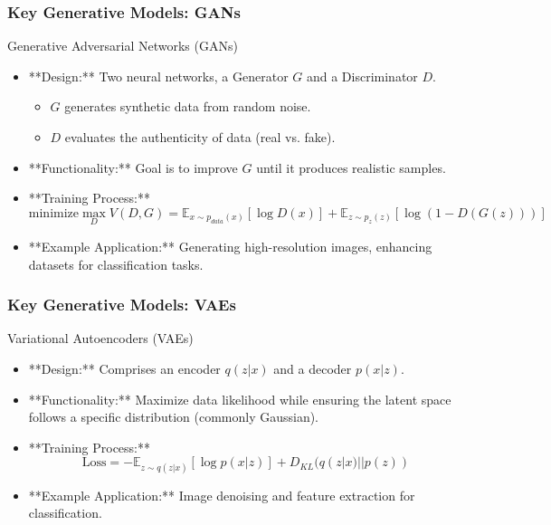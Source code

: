 \documentclass[aspectratio=169]{beamer}
\begin{document}
\begin{frame}[fragile]
    \frametitle{Key Generative Models: GANs}
    \begin{block}{Generative Adversarial Networks (GANs)}
        \begin{itemize}
            \item **Design:** Two neural networks, a Generator \( G \) and a Discriminator \( D \).
                \begin{itemize}
                    \item \( G \) generates synthetic data from random noise.
                    \item \( D \) evaluates the authenticity of data (real vs. fake).
                \end{itemize}
            \item **Functionality:** Goal is to improve \( G \) until it produces realistic samples.
            \item **Training Process:**
                \begin{equation}
                    \text{minimize} \max_{D} V(D, G) = \mathbb{E}_{x \sim p_{data}(x)}[\log D(x)] + \mathbb{E}_{z \sim p_{z}(z)}[\log(1 - D(G(z)))]
                \end{equation}
            \item **Example Application:** Generating high-resolution images, enhancing datasets for classification tasks.
        \end{itemize}
    \end{block}
\end{frame}

\begin{frame}[fragile]
    \frametitle{Key Generative Models: VAEs}
    \begin{block}{Variational Autoencoders (VAEs)}
        \begin{itemize}
            \item **Design:** Comprises an encoder \( q(z|x) \) and a decoder \( p(x|z) \).
            \item **Functionality:** Maximize data likelihood while ensuring the latent space follows a specific distribution (commonly Gaussian).
            \item **Training Process:**
                \begin{equation}
                    \text{Loss} = -\mathbb{E}_{z \sim q(z|x)}[\log p(x|z)] + D_{KL}(q(z|x) || p(z))
                \end{equation}
            \item **Example Application:** Image denoising and feature extraction for classification.
        \end{itemize}
    \end{block}
\end{frame}
\end{document}
